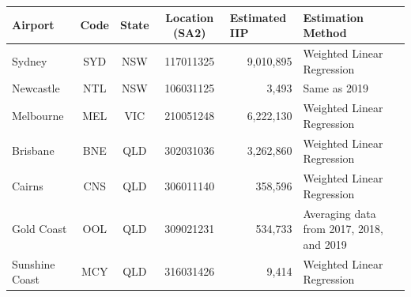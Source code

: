 \documentclass{article}
\begin{document}
\begin{appendices}
\begin{table}[ht]
\centering
\def\arraystretch{1.2}
\begin{tabular}{|l|c|c|c|r|l|}
\hline
\rowcolor[HTML]{C0C0C0} 
\textbf{Airport}   & \textbf{Code}           & \textbf{State}   & \textbf{Location (SA2)}          & \multicolumn{1}{l|}{\cellcolor[HTML]{C0C0C0}\textbf{Estimated IIP}} & \textbf{Estimation Method}                                      \\ \hline
\rowcolor[HTML]{FFFFFF} 
{\color[HTML]{000000} Sydney}    & {\color[HTML]{000000} SYD}     & {\color[HTML]{000000} NSW} & {\color[HTML]{000000} 117011325} & {\color[HTML]{000000} 9,010,895}                                           & {\color[HTML]{000000} Weighted Linear Regression}               \\
\rowcolor[HTML]{FFFFFF} 
{\color[HTML]{000000} Newcastle} & {\color[HTML]{000000} NTL}     & {\color[HTML]{000000} NSW} & {\color[HTML]{000000} 106031125} & {\color[HTML]{000000} 3,493}                                               & {\color[HTML]{000000} Same as 2019}                             \\
\rowcolor[HTML]{FFFFFF} 
{\color[HTML]{000000} Melbourne} & {\color[HTML]{000000} MEL}     & {\color[HTML]{000000} VIC} & {\color[HTML]{000000} 210051248} & {\color[HTML]{000000} 6,222,130}                                           & {\color[HTML]{000000} Weighted Linear Regression}               \\
\rowcolor[HTML]{FFFFFF} 
{\color[HTML]{000000} Brisbane}  & {\color[HTML]{000000} BNE}     & {\color[HTML]{000000} QLD} & {\color[HTML]{000000} 302031036} & {\color[HTML]{000000} 3,262,860}                                           & {\color[HTML]{000000} Weighted Linear Regression}               \\
\rowcolor[HTML]{FFFFFF} 
{\color[HTML]{000000} Cairns}    & {\color[HTML]{000000} CNS}     & {\color[HTML]{000000} QLD} & {\color[HTML]{000000} 306011140} & {\color[HTML]{000000} 358,596}                                             & {\color[HTML]{000000} Weighted Linear Regression}               \\
\rowcolor[HTML]{FFFFFF} 
{\color[HTML]{000000} Gold Coast} & {\color[HTML]{000000} OOL}    & {\color[HTML]{000000} QLD} & {\color[HTML]{000000} 309021231} & {\color[HTML]{000000} 534,733}                                             & {\color[HTML]{000000} Averaging data from 2017, 2018, and 2019} \\
\rowcolor[HTML]{FFFFFF} 
{\color[HTML]{000000} Sunshine Coast} & {\color[HTML]{000000} MCY} & {\color[HTML]{000000} QLD} & {\color[HTML]{000000} 316031426} & {\color[HTML]{000000} 9,414}                                               & {\color[HTML]{000000} Weighted Linear Regression}               \\

\end{tabular}
\end{table}
\end{appendices}
\end{document}
